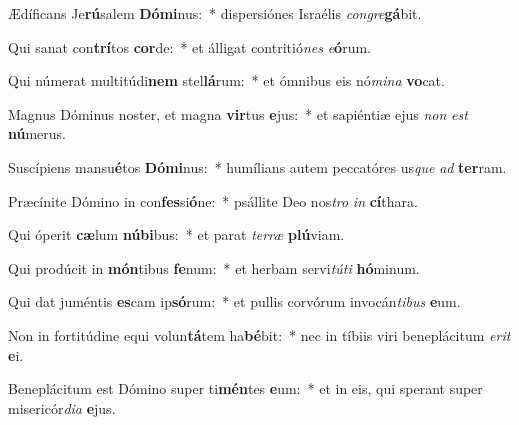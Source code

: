 \item Ædíficans Je\textbf{rú}salem \textbf{Dó}\textbf{mi}nus:~* dispersiónes Israélis \textit{con}\textit{gre}\textbf{gá}bit.
\item Qui sanat con\textbf{trí}tos \textbf{cor}de:~* et álligat contritió\textit{nes} \textit{e}\textbf{ó}rum.
\item Qui númerat multitúdi\textbf{nem} stel\textbf{lá}rum:~* et ómnibus eis nó\textit{mi}\textit{na} \textbf{vo}cat.
\item Magnus Dóminus noster, et magna \textbf{vir}tus \textbf{e}jus:~* et sapiéntiæ ejus \textit{non} \textit{est} \textbf{nú}merus.
\item Suscípiens mansu\textbf{é}tos \textbf{Dó}\textbf{mi}nus:~* humílians autem peccatóres us\textit{que} \textit{ad} \textbf{ter}ram.
\item Præcínite Dómino in con\textbf{fes}si\textbf{ó}ne:~* psállite Deo nos\textit{tro} \textit{in} \textbf{cí}thara.
\item Qui óperit \textbf{cæ}lum \textbf{nú}\textbf{bi}bus:~* et parat \textit{ter}\textit{ræ} \textbf{plú}viam.
\item Qui prodúcit in \textbf{món}tibus \textbf{fe}num:~* et herbam servi\textit{tú}\textit{ti} \textbf{hó}minum.
\item Qui dat juméntis \textbf{es}cam ip\textbf{só}rum:~* et pullis corvórum invocán\textit{ti}\textit{bus} \textbf{e}um.
\item Non in fortitúdine equi volun\textbf{tá}tem ha\textbf{bé}bit:~* nec in tíbiis viri beneplácitum \textit{e}\textit{rit} \textbf{e}i.
\item Beneplácitum est Dómino super ti\textbf{mén}tes \textbf{e}um:~* et in eis, qui sperant super misericór\textit{di}\textit{a} \textbf{e}jus.
